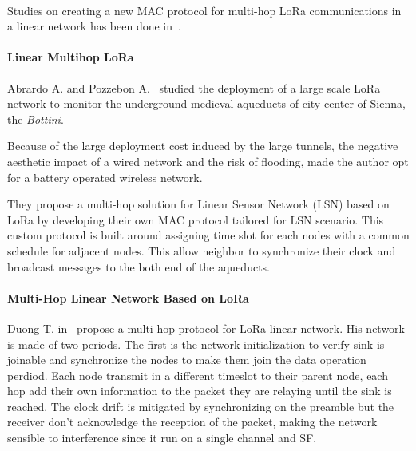 \paragraph{}

Studies on creating a new MAC protocol for multi-hop LoRa communications in a linear
network has been done in~\cite{Abrardo_2019,duong2018}.

\paragraph{Linear Multihop LoRa}

Abrardo A. and Pozzebon A.~\cite{Abrardo_2019} studied the deployment of a
large scale LoRa network to monitor the underground medieval aqueducts of city center 
of Sienna, the \emph{Bottini}.

Because of the large deployment cost induced by the large tunnels, the negative 
aesthetic impact of a wired network and the risk of flooding, made the author
opt for a battery operated wireless network.

They propose a multi-hop solution for Linear Sensor Network (LSN) based on LoRa by
developing their own MAC protocol tailored for LSN scenario.
This custom protocol is built around assigning time slot for each nodes with
a common schedule for adjacent nodes.
This allow neighbor to synchronize their clock and broadcast messages to the
both end of the aqueducts.


\paragraph{Multi-Hop Linear Network Based on LoRa}

Duong T. in~\cite{duong2018} propose a multi-hop protocol for LoRa linear
network. 
His network is made of two periods. The first is the network initialization to
verify sink is joinable and synchronize the nodes to make them join the data
operation perdiod.
Each node transmit in a different timeslot to their parent node, each hop add
their own information to the packet they are relaying until the sink is
reached.
The clock drift is mitigated by synchronizing on the preamble but the receiver
don't acknowledge the reception of the packet, making the network sensible to
interference since it run on a single channel and SF.

\paragraph{}

